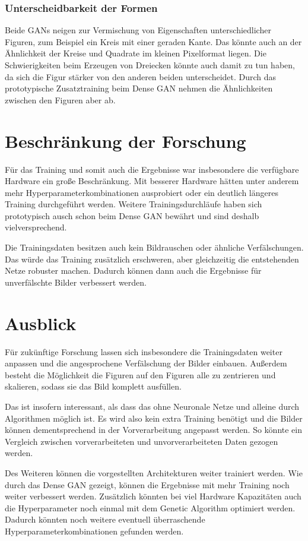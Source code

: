 \subsubsection{Unterscheidbarkeit der Formen}
Beide GANs neigen zur Vermischung von Eigenschaften unterschiedlicher Figuren, zum Beispiel ein Kreis mit einer geraden Kante.
Das könnte auch an der Ähnlichkeit der Kreise und Quadrate im kleinen Pixelformat liegen.
Die Schwierigkeiten beim Erzeugen von Dreiecken könnte auch damit zu tun haben, da sich die Figur stärker von den anderen beiden unterscheidet.
Durch das prototypische Zusatztraining beim Dense GAN nehmen die Ähnlichkeiten zwischen den Figuren aber ab.

\section{Beschränkung der Forschung}
Für das Training und somit auch die Ergebnisse war insbesondere die verfügbare Hardware ein große Beschränkung.
Mit besserer Hardware hätten unter anderem mehr Hyperparameterkombinationen ausprobiert oder ein deutlich längeres Training durchgeführt werden.
Weitere Trainingsdurchläufe haben sich prototypisch ausch schon beim Dense GAN bewährt und sind deshalb vielversprechend.
\newline

Die Trainingsdaten besitzen auch kein Bildrauschen oder ähnliche Verfälschungen.
Das würde das Training zusätzlich erschweren, aber gleichzeitig die entstehenden Netze robuster machen.
Dadurch können dann auch die Ergebnisse für unverfälschte Bilder verbessert werden.

\section{Ausblick}
Für zukünftige Forschung lassen sich insbesondere die Trainingsdaten weiter anpassen und die angesprochene Verfälschung der Bilder einbauen.
Außerdem besteht die Möglichkeit die Figuren auf den Figuren alle zu zentrieren und skalieren, sodass sie das Bild komplett ausfüllen.

Das ist insofern interessant, als dass das ohne Neuronale Netze und alleine durch Algorithmen möglich ist.
Es wird also kein extra Training benötigt und die Bilder können dementsprechend in der Vorverarbeitung angepasst werden.
So könnte ein Vergleich zwischen vorverarbeiteten und unvorverarbeiteten Daten gezogen werden.
\newline

Des Weiteren können die vorgestellten Architekturen weiter trainiert werden.
Wie durch das Dense GAN gezeigt, können die Ergebnisse mit mehr Training noch weiter verbessert werden.
Zusätzlich könnten bei viel Hardware Kapazitäten auch die Hyperparameter noch einmal mit dem Genetic Algorithm optimiert werden.
Dadurch könnten noch weitere eventuell überraschende Hyperparameterkombinationen gefunden werden.
